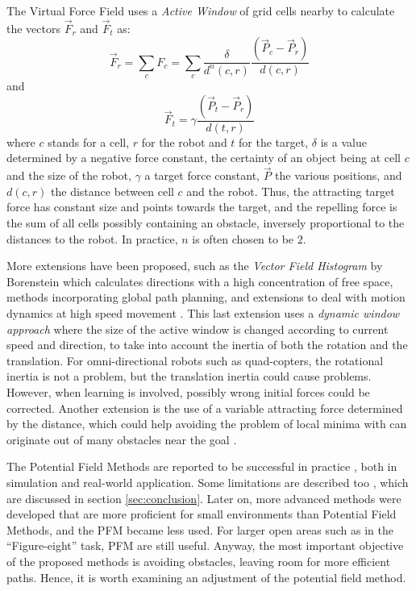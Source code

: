 \documentclass[11pt]{article}
\begin{document}
The Virtual Force Field uses a \emph{Active Window} of grid cells nearby to calculate the vectors $\vec{F}_r$ and $\vec{F}_t$ as:
  \[ \vec{F}_r = \sum_{c} F_{c} = \sum_{c} \frac{\delta}{d^n(c, r)} \frac{(\vec{P}_c - \vec{P}_r)}{ d(c, r) } \]
and
  \[ \vec{F}_t = \gamma \frac{(\vec{P}_t - \vec{P}_r)}{ d(t, r) } \]
where $c$ stands for a cell, $r$ for the robot and $t$ for the target, $\delta$ is a value determined by a negative force constant, the certainty of an object being at cell $c$ and the size of the robot, $\gamma$ a target force constant, $\vec{P}$ the various positions, and $d(c, r)$ the distance between cell $c$ and the robot. Thus, the attracting target force has constant size and points towards the target, and the repelling force is the sum of all cells possibly containing an obstacle, inversely proportional to the distances to the robot. In practice, $n$ is often chosen to be $2$.

More extensions have been proposed, such as the \emph{Vector Field Histogram} by Borenstein which calculates directions with a high concentration of free space, methods incorporating global path planning, and extensions to deal with motion dynamics at high speed movement \cite{burgard97}. This last extension uses a \emph{dynamic window approach} where the size of the active window is changed according to current speed and direction, to take into account the inertia of both the rotation and the translation. For omni-directional robots such as quad-copters, the rotational inertia is not a problem, but the translation inertia could cause problems. However, when learning is involved, possibly wrong initial forces could be corrected. Another extension is the use of a variable attracting force determined by the distance, which could help avoiding the problem of local minima with can originate out of many obstacles near the goal \cite{ge00}.

The Potential Field Methods are reported to be successful in practice \cite{brooks86, koren91, burgard99}, both in simulation and real-world application. Some limitations are described too \cite{koren91}, which are discussed in section \ref{sec:conclusion}. Later on, more advanced methods were developed that are more proficient for small environments than Potential Field Methods, and the PFM became less used. For larger open areas such as in the ``Figure-eight'' task, PFM are still useful. Anyway, the most important objective of the proposed methods is avoiding obstacles, leaving room for more efficient paths. Hence, it is worth examining an adjustment of the potential field method.
\end{document}
